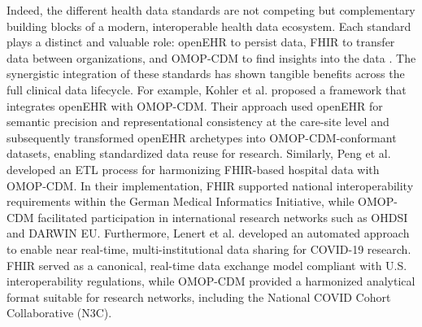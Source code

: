 Indeed, the different health data standards are not competing but complementary building blocks of a modern, interoperable health data ecosystem. Each standard plays a distinct and valuable role: openEHR to persist data, FHIR to transfer data between organizations, and OMOP-CDM to find insights into the data \cite{tsafnat_converge_2024}. The synergistic integration of these standards has shown tangible benefits across the full clinical data lifecycle. For example, Kohler et al. \cite{kohler_eos_2023} proposed a framework that integrates openEHR with OMOP-CDM. Their approach used openEHR for semantic precision and representational consistency at the care-site level and subsequently transformed openEHR archetypes into OMOP-CDM-conformant datasets, enabling standardized data reuse for research. Similarly, Peng et al. \cite{peng_etl-process_2023} developed an ETL process for harmonizing FHIR-based hospital data with OMOP-CDM. In their implementation, FHIR supported national interoperability requirements within the German Medical Informatics Initiative, while OMOP-CDM facilitated participation in international research networks such as OHDSI and DARWIN EU. Furthermore, Lenert et al. \cite{lenert_automated_2021} developed an automated approach to enable near real-time, multi-institutional data sharing for COVID-19 research. FHIR served as a canonical, real-time data exchange model compliant with U.S. interoperability regulations, while OMOP-CDM provided a harmonized analytical format suitable for research networks, including the National COVID Cohort Collaborative (N3C).

